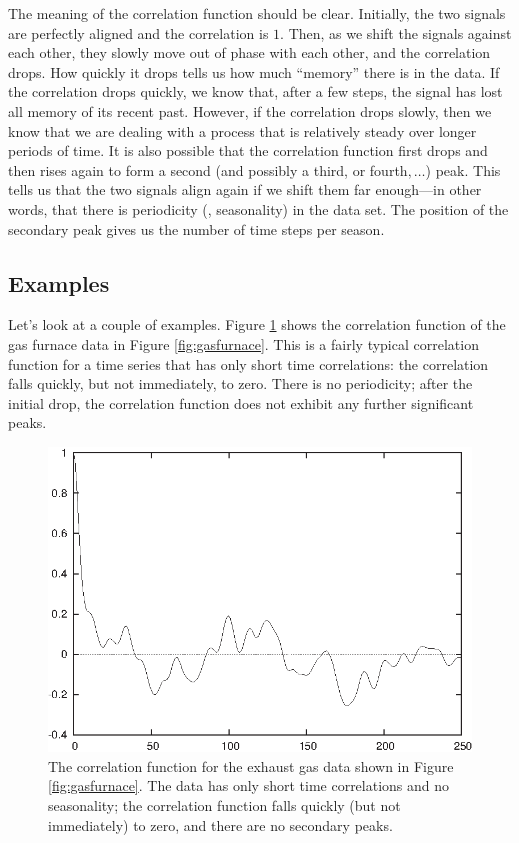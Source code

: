 The meaning of the correlation function should be clear. Initially,
the two signals are perfectly aligned and the correlation is $1$.
Then, as we shift the signals against each other, they slowly move out
of phase with each\vadjust{\pagebreak} other, and the correlation drops. How quickly it
drops tells us how much ``memory'' there is in the data. If the
correlation drops quickly, we know that, after a few steps, the signal
has lost all memory of its recent past. However, if the correlation
drops slowly, then we know that we are dealing with a process that is
relatively steady over longer periods of time. It is also possible
that the correlation function first drops and then rises again to form
a second (and possibly a third, or fourth$,\dots$) peak. This tells us
that the two signals align again if we shift them far enough---in
other words, that there is periodicity (\ie, seasonality) in the data
set. The position of the secondary peak gives us the number of time
steps per season.

\vspace*{6pt}
\subsection{Examples}
Let's look at a couple of examples. Figure \ref{fig:gasfurnacecorr}
shows the correlation function of the gas furnace data in Figure
\ref{fig:gasfurnace}. This is a fairly typical correlation function
for a time series that has only short time correlations: the
correlation falls quickly, but not immediately, to zero. There is no
periodicity; after the initial drop, the correlation function does not
exhibit any further significant\vadjust{\vfill\pagebreak} peaks.





\begin{figure}
    \centerline{\includegraphics{img/gasfurnacecorr}}
  \caption{The correlation function for the exhaust gas data shown in
    Figure \ref{fig:gasfurnace}. The data has only short time
    correlations and no seasonality; the correlation function falls
    quickly (but not immediately) to zero, and there are no secondary
    peaks.}
  \label{fig:gasfurnacecorr}
\end{figure}


